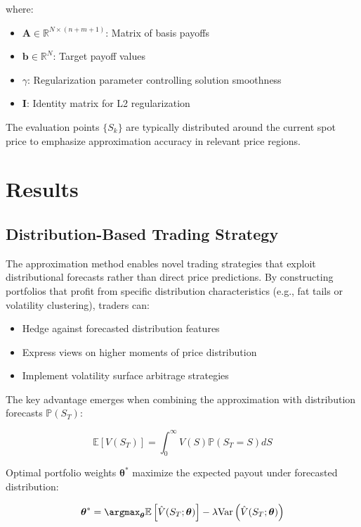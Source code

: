 \documentclass[12pt]{article}
\begin{document}
where:
\begin{itemize}
\item \( \mathbf{A} \in \mathbb{R}^{N \times (n+m+1)} \): Matrix of basis payoffs
\item \( \mathbf{b} \in \mathbb{R}^N \): Target payoff values
\item \( \gamma \): Regularization parameter controlling solution smoothness
\item \( \mathbf{I} \): Identity matrix for L2 regularization
\end{itemize}

The evaluation points \( \{S_k\} \) are typically distributed around the current
spot price to emphasize approximation accuracy in relevant price regions.

\section{Results}
\subsection{Distribution-Based Trading Strategy}
The approximation method enables novel trading strategies that exploit distributional forecasts rather than direct price predictions. By constructing portfolios that profit from specific distribution characteristics (e.g., fat tails or volatility clustering), traders can:

\begin{itemize}
\item Hedge against forecasted distribution features
\item Express views on higher moments of price distribution
\item Implement volatility surface arbitrage strategies
\end{itemize}

The key advantage emerges when combining the approximation with distribution forecasts $\mathbb{P}(S_T)$:
 
\begin{equation}
\mathbb{E}[V(S_T)] = \int_{0}^{\infty} V(S) \mathbb{P}(S_T = S) dS
\end{equation}

Optimal portfolio weights $\boldsymbol{\theta}^*$ maximize the expected payout under forecasted distribution:

\begin{equation}
\boldsymbol{\theta}^* = \argmax_{\boldsymbol{\theta}} \mathbb{E}\left[\hat{V}(S_T;\boldsymbol{\theta})\right] - \lambda \text{Var}\left(\hat{V}(S_T;\boldsymbol{\theta})\right)
\end{equation}
\end{document}
